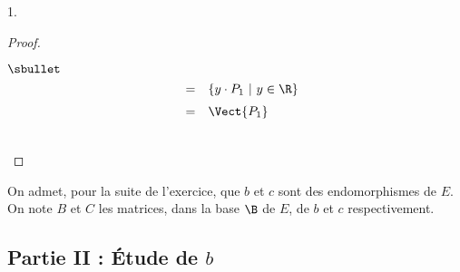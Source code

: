 \begin{noliste}{1.}
\begin{proof}
\begin{remark}
\begin{noliste}{$\sbullet$}
\[\begin{array}{rcl}
          & = & \left\{ 
            y \cdot P_1 \ \vert \
            y \in \R
          \right\}
          \\[.2cm]
          & = & \Vect{P_1}
	\end{array}
	\]
      \end{noliste}
    \end{remark}~\\[-1.2cm]
  \end{proof}
  On admet, pour la suite de l'exercice, que $b$ et $c$ sont des
  endomorphismes de $E$.\\
  On note $B$ et $C$ les matrices, dans la base $\B$ de $E$, de $b$ et
  $c$ respectivement.
\end{noliste}


\newpage


\subsection*{Partie II : Étude de $b$}


